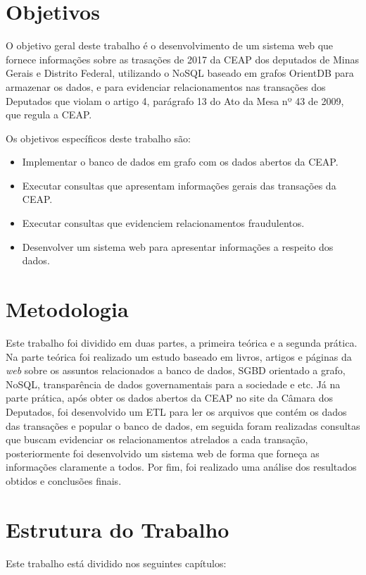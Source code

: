 \section{Objetivos}
	O objetivo geral deste trabalho é o desenvolvimento de um sistema web que fornece informações sobre as trasações de 2017 da CEAP dos deputados de Minas Gerais e Distrito Federal, utilizando o NoSQL baseado em grafos OrientDB para armazenar os dados, e para evidenciar relacionamentos nas transações dos Deputados que violam o artigo 4, parágrafo 13 do Ato da Mesa nº 43 de 2009, que regula a CEAP. 
	
	Os objetivos específicos deste trabalho são:
	\begin{itemize}
		\item Implementar o banco de dados em grafo com os dados abertos da CEAP.
		\item Executar consultas que apresentam informações gerais das transações da CEAP.
		\item Executar consultas que evidenciem relacionamentos fraudulentos.				
		\item Desenvolver um sistema web para apresentar informações a respeito dos dados.
	\end{itemize}

\section{Metodologia}

	Este trabalho foi dividido em duas partes, a primeira teórica e a segunda prática. Na parte teórica foi realizado um estudo baseado em livros, artigos e páginas da \textit{web} sobre os assuntos relacionados a banco de dados, SGBD orientado a grafo, NoSQL, transparência de dados governamentais para a sociedade e etc. Já na parte prática, após obter os dados abertos da CEAP no site da Câmara dos Deputados, foi desenvolvido um ETL para ler os arquivos que contém os dados das transações e popular o banco de dados, em seguida foram realizadas consultas que buscam evidenciar os relacionamentos atrelados a cada transação, posteriormente foi desenvolvido um sistema web de forma que forneça as informações claramente a todos. Por fim, foi realizado uma análise dos resultados obtidos e conclusões finais.

\section{Estrutura do Trabalho}
	Este trabalho está dividido nos seguintes capítulos:
	
